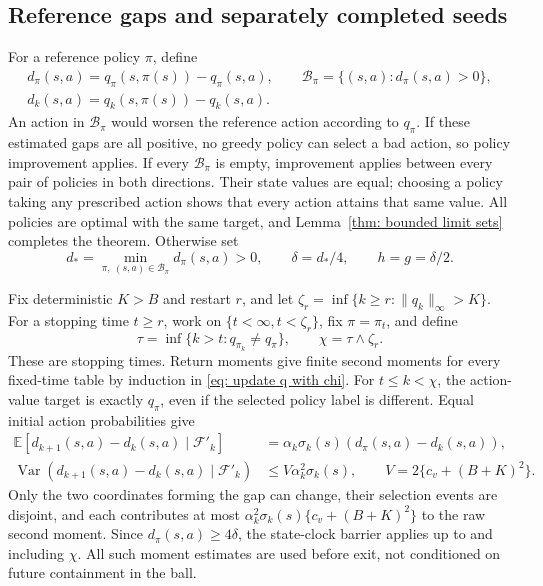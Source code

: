 \subsection{Reference gaps and separately completed seeds}
For a reference policy $\pi$, define
\begin{equation}\label{eq:gaps}
\begin{gathered}
d_\pi(s,a)=q_\pi(s,\pi(s))-q_\pi(s,a),\qquad
\mathcal B_\pi=\{(s,a):d_\pi(s,a)>0\},\\
d_k(s,a)=q_k(s,\pi(s))-q_k(s,a).
\end{gathered}
\end{equation}
An action in $\mathcal B_\pi$ would worsen the reference action according to $q_\pi$. If these estimated gaps
are all positive, no greedy policy can select a bad action, so policy improvement applies. If
every $\mathcal B_\pi$ is empty, improvement applies between every pair of policies in both directions.
Their state values are equal; choosing a policy taking any prescribed action shows that every
action attains that same value. All policies are optimal with the same target, and Lemma~\ref{thm: bounded limit sets}
completes the theorem. Otherwise set
\begin{equation}\label{eq:constants}
d_* = \min_{\pi,\ (s,a)\in\mathcal B_\pi}d_\pi(s,a)>0,\qquad
\delta=d_*/4,\qquad h=g=\delta/2.
\end{equation}

Fix deterministic $K>B$ and restart $r$, and let $\zeta_r=\inf\{k\ge r:\|q_k\|_\infty>K\}$. For a
stopping time $t\ge r$, work on $\{t<\infty,t<\zeta_r\}$, fix $\pi=\pi_t$, and define
\begin{equation}\label{eq:stops}
\tau=\inf\{k>t:q_{\pi_k}\ne q_\pi\},\qquad \chi=\tau\wedge\zeta_r.
\end{equation}
These are stopping times. Return moments give finite second moments for every fixed-time
table by induction in \eqref{eq: update q with chi}. For $t\le k<\chi$, the action-value target is exactly $q_\pi$, even if the
selected policy label is different. Equal initial action probabilities give
\begin{align}
\mathbb E[d_{k+1}(s,a)-d_k(s,a)\mid\mathcal F'_k]
&=\alpha_k\sigma_k(s)(d_\pi(s,a)-d_k(s,a)),\label{eq:gapdrift}\\
\operatorname{Var}(d_{k+1}(s,a)-d_k(s,a)\mid\mathcal F'_k)
&\le V\alpha_k^2\sigma_k(s),\qquad V=2\{c_v+(B+K)^2\}.\label{eq:gapvariance}
\end{align}
Only the two coordinates forming the gap can change, their selection events are disjoint,
and each contributes at most $\alpha_k^2\sigma_k(s)\{c_v+(B+K)^2\}$ to the raw second moment. Since
$d_\pi(s,a)\ge4\delta$, the state-clock barrier applies up to and including $\chi$. All such moment estimates
are used before exit, not conditioned on future containment in the ball.


